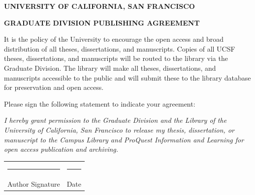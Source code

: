 \documentclass[12pt,oneside]{report}
\begin{document}

\begin{center}
  {\Large\textbf{UNIVERSITY OF CALIFORNIA, SAN FRANCISCO}}\par
  \vspace{0.1in}
  {\large\textbf{GRADUATE DIVISION PUBLISHING AGREEMENT}}\par
\end{center}

\vspace{0.3in}
\noindent It is the policy of the University to encourage the open access and broad distribution of all theses, dissertations, and manuscripts. Copies of all UCSF theses, dissertations, and manuscripts will be routed to the library via the Graduate Division. The library will make all theses, dissertations, and manuscripts accessible to the public and will submit these to the library database for preservation and open access.

\vspace{0.3in}
\noindent Please sign the following statement to indicate your agreement:

\vspace{0.2in}
\noindent \textit{I hereby grant permission to the Graduate Division and the Library of the University of California, San Francisco to release my thesis, dissertation, or manuscript to the Campus Library and ProQuest Information and Learning for open access publication and archiving.}

\vspace{0.8in}
\noindent
\begin{tabular}{ll}
  \rule{3.5in}{0.5pt} & \rule{2.0in}{0.5pt}\tabularnewline
  Author Signature & Date\tabularnewline
\end{tabular}
\end{document}
